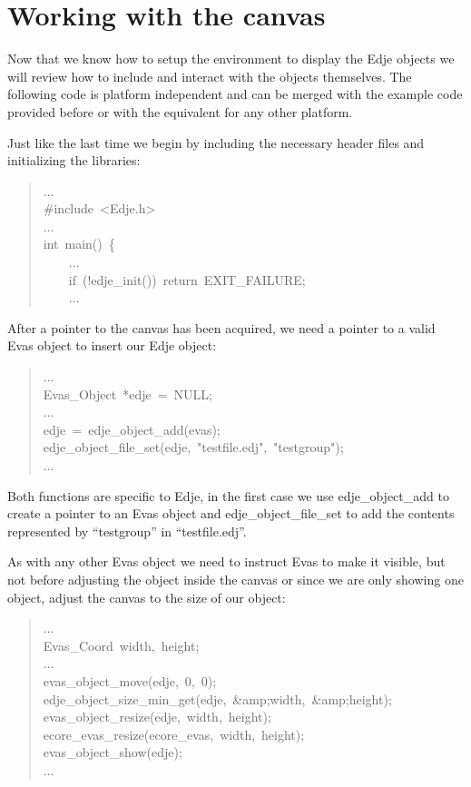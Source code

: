 \documentclass[12pt,a4paper,english]{book}
\begin{document}

\hypertarget{working-with-the-canvas}{}
\section{Working with the canvas}

Now that we know how to setup the environment to display the Edje objects we
will review how to include and interact with the objects themselves. The
following code is platform independent and can be merged with the example code
provided before or with the equivalent for any other platform.

Just like the last time we begin by including the necessary header files and
initializing the libraries:
\begin{quote}{\ttfamily \raggedright \noindent
...~\\
{\#}include~<Edje.h>~\\
...~\\
int~main()~{\{}~\\
~~~~...~\\
~~~~if~(!edje{\_}init())~return~EXIT{\_}FAILURE;~\\
~~~~...
}\end{quote}

After a pointer to the canvas has been acquired, we need a pointer to a valid
Evas object to insert our Edje object:
\begin{quote}{\ttfamily \raggedright \noindent
...~\\
Evas{\_}Object~*edje~=~NULL;~\\
...~\\
edje~=~edje{\_}object{\_}add(evas);~\\
edje{\_}object{\_}file{\_}set(edje,~"testfile.edj",~"testgroup");~\\
...
}\end{quote}

Both functions are specific to Edje, in the first case we use edje{\_}object{\_}add
to create a pointer to an Evas object and edje{\_}object{\_}file{\_}set to add the
contents represented by ``testgroup'' in ``testfile.edj''.

As with any other Evas object we need to instruct Evas to make it visible, but
not before adjusting the object inside the canvas or since we are only showing
one object, adjust the canvas to the size of our object:
\begin{quote}{\ttfamily \raggedright \noindent
...~\\
Evas{\_}Coord~width,~height;~\\
...~\\
evas{\_}object{\_}move(edje,~0,~0);~\\
edje{\_}object{\_}size{\_}min{\_}get(edje,~{\&}amp;width,~{\&}amp;height);~\\
evas{\_}object{\_}resize(edje,~width,~height);~\\
ecore{\_}evas{\_}resize(ecore{\_}evas,~width,~height);~\\
evas{\_}object{\_}show(edje);~\\
...
}\end{quote}
\end{document}

